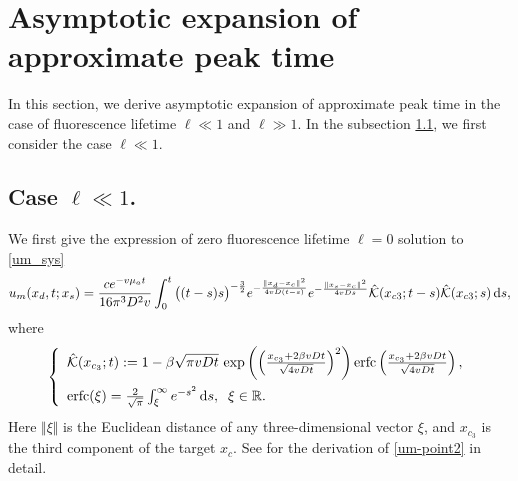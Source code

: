 \documentclass[10pt]{article}
\numberwithin{equation}{section}
\numberwithin{figure}{section}
\begin{document}
\section{Asymptotic expansion of approximate peak time}\label{sec_asym}
In this section, we derive asymptotic expansion of approximate peak time in the case of fluorescence lifetime $\ell \ll 1$ and $\ell \gg 1$. In the subsection \ref{ellsmall}, we first consider the case $\ell \ll 1$.
\subsection{Case $\ell \ll 1$.}\label{ellsmall}
We first give the expression of zero fluorescence lifetime $\ell =0$ solution to \eqref{um_sys}
\begin{equation}\label{um-point2}
\begin{split}
u_m(x_d,t; x_s) = \frac{ce^{-v \mu_a t}}{16\pi^3 D^2v} \int_0^t \big((t-s)s\big)^{-\frac{3}{2}}  e^{-\frac{\|x_d-x_c\|^2}{4vD(t-s)}} e^{-\frac{\|x_s-x_c\|^2}{4vDs}} 
{\hat {\mathcal K}}(x_{c3};t-s) {\hat {\mathcal K}}(x_{c3};s) \,{\rm d}s,
\end{split}
\end{equation}
where
\begin{equation*}
\left\{
\begin{array}{ll}
{\hat {\mathcal K}}(x_{c_3};t) :=1-\beta\sqrt{\pi vDt} \,\exp{\left(\left(\frac{x_{c_3}+2\beta vDt}{\sqrt{4vDt}}\right)^2\right)}
\mathop{\mathrm{erfc}}
\left(\frac{x_{c_3}+2\beta vDt}{\sqrt{4vDt}}\right),\vspace{5pt} \\
{\rm erfc}(\xi)=\frac{2}{\sqrt{\pi}}\int_\xi^\infty e^{-s^2} \, {\rm d}s, \; \; \xi\in \mathbb{R}.
\end{array}
\right.
\end{equation*}
Here $\Vert\xi\Vert$ is the Euclidean distance of any three-dimensional vector $\xi$, and $x_{c_3}$ is the third component of the target $x_c$. 
See \cite[Section 2]{Eom2023b} for the derivation of \eqref{um-point2} in detail.
\end{document}
